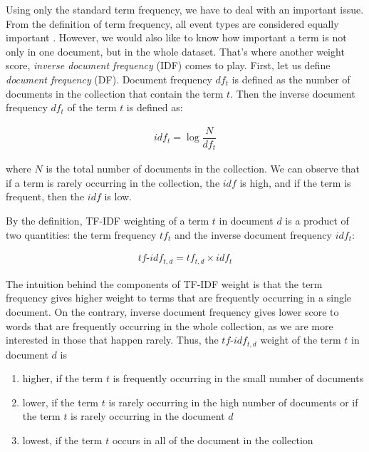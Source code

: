 Using only the standard term frequency, we have to deal with an important issue. From the definition of term frequency, all event types are considered equally important \cite{informationRetrieval2008}. However, we would also like to know how important a term is not only in one document, but in the whole dataset. That's where another weight score, \textit{inverse document frequency} (IDF) comes to play. First, let us define \textit{document frequency} (DF). Document frequency $df_t$ is defined as the number of documents in the collection that contain the term $t$. Then the inverse document frequency $df_t$ of the term $t$ is defined as: 

\begin{gather}
    idf_t = \log{\dfrac{N}{df_t}}
    \label{formula:idf}
\end{gather}

where $N$ is the total number of documents in the collection. We can observe that if a term is rarely occurring in the collection, the $idf$ is high, and if the term is frequent, then the $idf$ is low.

By the definition, TF-IDF weighting of a term $t$ in document $d$ is a product of two quantities: the term frequency $tf_t$ and the inverse document frequency $idf_t$:

\begin{gather}
    tf\text{-}idf_{t, d} = tf_{t,d} \times idf_t
    \label{formula:tfidf}
\end{gather}

The intuition behind the components of TF-IDF weight is that the term frequency gives higher weight to terms that are frequently occurring in a single document. On the contrary, inverse document frequency gives lower score to words that are frequently occurring in the whole collection, as we are more interested in those that happen rarely. Thus, the $tf\text{-}idf_{t, d}$ weight of the term $t$ in document $d$ is 

\begin{enumerate}
    \item higher, if the term $t$ is frequently occurring in the small number of documents
    \item lower, if the term $t$ is rarely occurring in the high number of documents or if the term $t$ is rarely occurring in the document $d$
    \item lowest, if the term $t$ occurs in all of the document in the collection
\end{enumerate}

